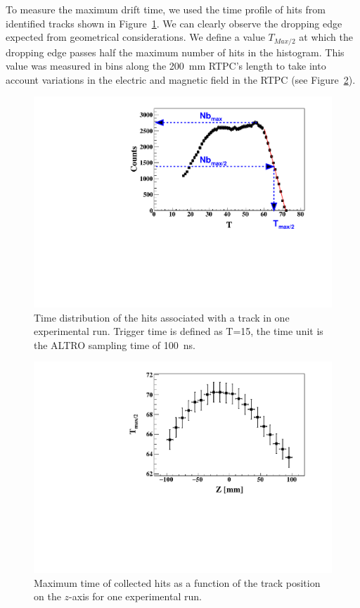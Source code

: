 \documentclass[preprint,5p]{elsarticle}
\begin{document}
To measure the maximum drift time, we used the time profile of hits from 
identified tracks shown in Figure~\ref{fig:TDC_profile}. We can clearly observe 
the dropping edge expected from geometrical considerations. We define a value 
$T_{Max/2}$ at which the dropping edge passes half the maximum number of hits 
in the histogram. This value was measured in bins along the 200~mm RTPC's 
length to take into account variations in the electric and magnetic field in 
the RTPC (see Figure~\ref{fig:RunNumber_61551_TDCmax_Zslice}). 

\begin{figure}[tb]
\centering
\includegraphics[scale=0.42]{hits_time_profile.pdf}
\caption[]{Time distribution of the hits associated with a track in one 
experimental run. Trigger time is defined as T=15, the time unit is the ALTRO 
sampling time of 100~ns.} 
\label{fig:TDC_profile}
\end{figure}

\begin{figure}[tb]
\centering
\includegraphics[scale=0.42]{RunNumber_61452_TDCmax_Zslice.pdf}
\caption{Maximum time of collected hits as a function of the track
              position on the $z$-axis for one experimental run. } 
\label{fig:RunNumber_61551_TDCmax_Zslice}
\end{figure}
\end{document}
